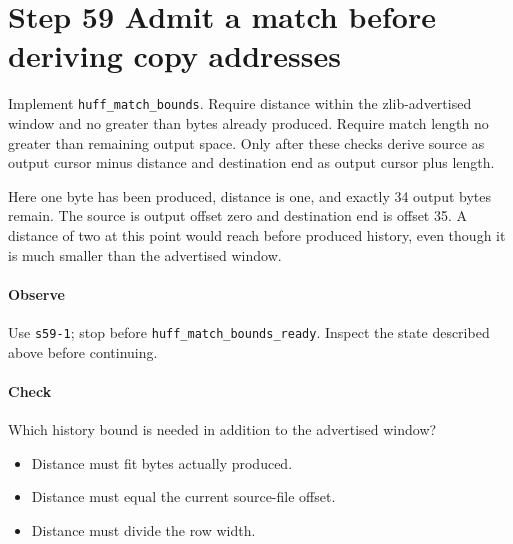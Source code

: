 \section{Step 59 Admit a match before deriving copy addresses}\label{png-huff-s59}
Implement \texttt{huff\_match\_bounds}. Require distance within the zlib-advertised window and no greater than bytes already produced. Require match length no greater than remaining output space. Only after these checks derive source as output cursor minus distance and destination end as output cursor plus length.

Here one byte has been produced, distance is one, and exactly 34 output bytes remain. The source is output offset zero and destination end is offset 35. A distance of two at this point would reach before produced history, even though it is much smaller than the advertised window.

\paragraph{Observe} Use \texttt{s59-1}; stop before \texttt{huff\_match\_bounds\_ready}. Inspect the state described above before continuing.

\paragraph{Check} Which history bound is needed in addition to the advertised window?
\begin{itemize}
\item[A.] Distance must fit bytes actually produced.
\item[B.] Distance must equal the current source-file offset.
\item[C.] Distance must divide the row width.
\end{itemize}
